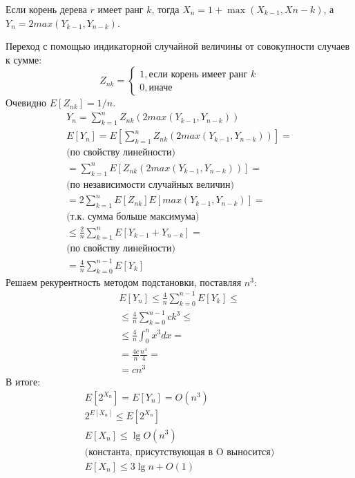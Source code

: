 \documentclass[11pt]{article}
\begin{document}
Если корень дерева $r$ имеет ранг $k$, тогда $X_n = 1 + \max(X_{k-1}, X{n-k})$, а $Y_n = 2max(Y_{k-1}, Y_{n-k})$.

Переход с помощью индикаторной случайной величины от совокупности случаев к сумме:
\begin{equation*}
  Z_{nk} = \begin{cases}
      1, \text{если корень имеет ранг } k\\
      0, \text{иначе}
  \end{cases}
\end{equation*}
Очевидно $E[Z_{nk}] = 1 / n$.
\begin{align*}
  Y_n = \sum_{k=1}^{n} Z_{nk} (2max(Y_{k-1}, Y_{n-k})) \\
  E[Y_n] = E[\sum_{k=1}^{n} Z_{nk} (2max(Y_{k-1}, Y_{n-k})) ] = \\
  \text{(по свойству линейности)} \\
  = \sum_{k=1}^{n} E[Z_{nk} (2max(Y_{k-1}, Y_{n-k}))] = \\
  \text{(по независимости случайных величин)} \\
  = 2 \sum_{k=1}^{n} E[Z_{nk}] E[max(Y_{k-1}, Y_{n-k})] = \\
  \text{(т.к. сумма больше максимума)} \\
  \leqslant \frac{2}{n} \sum_{k=1}^{n} E[Y_{k-1} + Y_{n-k}] = \\
  \text{(по свойству линейности)} \\
  = \frac{4}{n}\sum_{k=0}^{n-1}E[Y_k]
\end{align*}
Решаем рекурентность методом подстановки, поставляя $n^3$:
\begin{align*}
  E[Y_n] \leqslant \frac{4}{n}\sum_{k=0}^{n-1}E[Y_k] \leqslant \\
  \leqslant \frac{4}{n}\sum_{k=0}^{n-1}c k^3 \leqslant \\
  \leqslant \frac{4}{n}\int_{0}^{n}x^3 dx = \\
  = \frac{4c}{n} \frac{n^4}{4} = \\
  = c n^3
\end{align*}
В итоге:
\begin{align*}
  E[2^{X_n}] = E[Y_n] = O(n^3) \\
  2^{E[X_n]} \leqslant E[2^{X_n}] \\
  E[X_n] \leqslant \lg O(n^3) \\
  \text{(константа, присутствующая в O выносится)} \\
  E[X_n] \leqslant 3 \lg n + O(1) \\
\end{align*}
\end{document}
